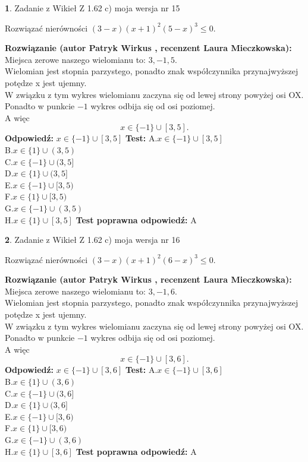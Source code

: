 \documentclass[12pt, a4paper]{article}
\theoremstyle{definition} %
\newtheorem{zad}{}
\newcommand{\zadStart}[1]{\begin{zad}#1\newline}
\newcommand{\zadStop}{\end{zad}}
\newcommand{\rozwStart}[2]{\noindent \textbf{Rozwiązanie (autor #1 , recenzent #2): }\newline}
\newcommand{\rozwStop}{\newline}
\newcommand{\odpStart}{\noindent \textbf{Odpowiedź:}\newline}
\newcommand{\odpStop}{\newline}
\newcommand{\testStart}{\noindent \textbf{Test:}\newline}
\newcommand{\testStop}{\newline}
\newcommand{\kluczStart}{\noindent \textbf{Test poprawna odpowiedź:}\newline}
\newcommand{\kluczStop}{\newline}
\begin{document}
\zadStart{Zadanie z Wikieł Z 1.62 c) moja wersja nr 15}

Rozwiązać nierówności $(3-x)(x+1)^{2}(5-x)^{3}\le0$.
\zadStop
\rozwStart{Patryk Wirkus}{Laura Mieczkowska}
Miejsca zerowe naszego wielomianu to: $3, -1, 5$.\\
Wielomian jest stopnia parzystego, ponadto znak współczynnika przy\linebreak najwyższej potędze x jest ujemny.\\ W związku z tym wykres wielomianu zaczyna się od lewej strony powyżej osi OX.\\
Ponadto w punkcie $-1$ wykres odbija się od osi poziomej.\\
A więc $$x \in \{-1\} \cup [3,5].$$
\rozwStop
\odpStart
$x \in \{-1\} \cup [3,5]$
\odpStop
\testStart
A.$x \in \{-1\} \cup [3,5]$\\
B.$x \in \{1\} \cup (3,5)$\\
C.$x \in \{-1\} \cup (3,5]$\\
D.$x \in \{1\} \cup (3,5]$\\
E.$x \in \{-1\} \cup [3,5)$\\
F.$x \in \{1\} \cup [3,5)$\\
G.$x \in \{-1\} \cup (3,5)$\\
H.$x \in \{1\} \cup [3,5]$
\testStop
\kluczStart
A
\kluczStop



\zadStart{Zadanie z Wikieł Z 1.62 c) moja wersja nr 16}

Rozwiązać nierówności $(3-x)(x+1)^{2}(6-x)^{3}\le0$.
\zadStop
\rozwStart{Patryk Wirkus}{Laura Mieczkowska}
Miejsca zerowe naszego wielomianu to: $3, -1, 6$.\\
Wielomian jest stopnia parzystego, ponadto znak współczynnika przy\linebreak najwyższej potędze x jest ujemny.\\ W związku z tym wykres wielomianu zaczyna się od lewej strony powyżej osi OX.\\
Ponadto w punkcie $-1$ wykres odbija się od osi poziomej.\\
A więc $$x \in \{-1\} \cup [3,6].$$
\rozwStop
\odpStart
$x \in \{-1\} \cup [3,6]$
\odpStop
\testStart
A.$x \in \{-1\} \cup [3,6]$\\
B.$x \in \{1\} \cup (3,6)$\\
C.$x \in \{-1\} \cup (3,6]$\\
D.$x \in \{1\} \cup (3,6]$\\
E.$x \in \{-1\} \cup [3,6)$\\
F.$x \in \{1\} \cup [3,6)$\\
G.$x \in \{-1\} \cup (3,6)$\\
H.$x \in \{1\} \cup [3,6]$
\testStop
\kluczStart
A
\kluczStop
\end{document}
